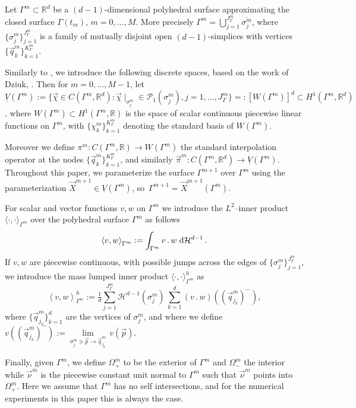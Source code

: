 \documentclass[a4paper,12pt,onecolumn]{article}
\newcommand{\R}{{\mathbb R}}
\newcommand{\dH}[1]{\;{\rm d}{\cal H}^{#1}} %
\newcommand{\Vh}{\underline{V}(\Gamma^m)}
\newcommand{\Wh}{W(\Gamma^m)}
\begin{document}
Let $\Gamma^{m}\subset\R^d$ be a $(d-1)$-dimensional polyhedral surface
approximating the closed surface $\Gamma(t_m)$, $m=0 ,\ldots, M$. More precisely
$\Gamma^m=\bigcup_{j=1}^{J^m_\Gamma} \overline{\sigma^m_j}$, where
$\{\sigma^m_j\}_{j=1}^{J^m_\Gamma}$ is a family of mutually disjoint open
$(d-1)$-simplices with vertices $\{\vec{q}^m_k\}_{k=1}^{K^m_\Gamma}$.

Similarly to \cite{gflows3d}, we introduce the following discrete spaces, based
on the work of Dziuk, \cite{Dziuk91}. Then for $m =0 ,\ldots, M-1$, let $\Vh :=
\{\vec\chi \in C(\Gamma^m,\R^d):\vec\chi\!\mid_{\sigma^m_j} \in
\mathcal{P}_1(\sigma^m_j), j=1,\ldots, J^m_\Gamma\} =: [\Wh]^d \subset
H^1(\Gamma^m,\R^d)$, where $\Wh \subset H^1(\Gamma^m,\R)$ is the space of scalar
continuous piecewise linear functions on $\Gamma^m$, with
$\{\chi^m_k\}_{k=1}^{K^m_\Gamma}$ denoting the standard basis of $\Wh$.

Moreover we define $\pi^m: C(\Gamma^m,\R)\to \Wh$ the standard interpolation
operator at the nodes $\{\vec{q}_k^m\}_{k=1}^{K^m_\Gamma}$, and similarly
$\vec\pi^m: C(\Gamma^m,\R^d)\to \Vh$. Throughout this paper, we parameterize the
surface $\Gamma^{m+1}$ over $\Gamma^m$ using the parameterization $\vec{X}^{m+1}
\in \Vh$, so\ $\Gamma^{m+1} = \vec{X}^{m+1}(\Gamma^m)$.

For scalar and vector functions $v,w$ on $\Gamma^m$ we introduce the
$L^2$--inner product $\langle\cdot,\cdot\rangle_{\Gamma^m}$ over the polyhedral
surface $\Gamma^m$ as follows
\begin{equation*}
\left\langle v, w \right\rangle_{\Gamma^m} := \int_{\Gamma^m} v\,.\,w \dH{d-1}\,.
\end{equation*}
If $v,w$ are piecewise continuous, with possible jumps across the edges of
$\{\sigma_j^m\}_{j=1}^{J^m_\Gamma}$, we introduce the mass lumped inner product
$\langle\cdot,\cdot\rangle_{\Gamma^m}^h$ as
\begin{equation} \label{eq:masslump}
\left\langle v, w \right\rangle^h_{\Gamma^m} := \tfrac1d
\sum_{j=1}^{J^m_\Gamma} \mathcal{H}^{d-1}(\sigma^m_j)\,\sum_{k=1}^{d}
(v\,.\,w)((\vec{q}^m_{j_k})^-),
\end{equation}
where $\{\vec{q}^m_{j_k}\}_{k=1}^{d}$ are the vertices of $\sigma^m_j$, and
where we define $v((\vec{q}^m_{j_k})^-):= \underset{\sigma^m_j\ni \vec{p}\to
\vec{q}^m_{j_k}}{\lim}\, v(\vec{p})$.

Finally, given $\Gamma^m$, we define $\Omega^m_+$ to be the exterior of
$\Gamma^m$ and $\Omega^m_-$ the interior while $\vec{\nu}^m$ is the piecewise
constant unit normal to $\Gamma^m$ such that $\vec\nu^m$ points into
$\Omega^m_+$. Here we assume that $\Gamma^m$ has no self intersections, and for
the numerical experiments in this paper this is always the case.
\end{document}
